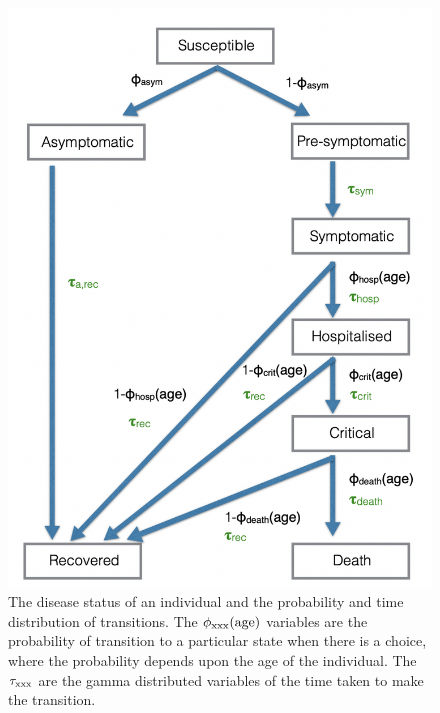 \documentclass[12pt, oneside]{amsart}   	%
\begin{document}
\begin{figure}
\centering
\includegraphics[width=.8\textwidth]{diseaseDynamics.png}
\caption{The disease status of an individual and the probability and time distribution of transitions. The $\phi_{\rm xxx}(\rm age)$ variables are the probability of transition to a particular state when there is a choice, where the probability depends upon the age of the individual.  The $\tau_{\rm xxx}$ are the gamma distributed variables of the time taken to make the transition.}
\label{diseaseDynamics}
\end{figure}
\end{document}
